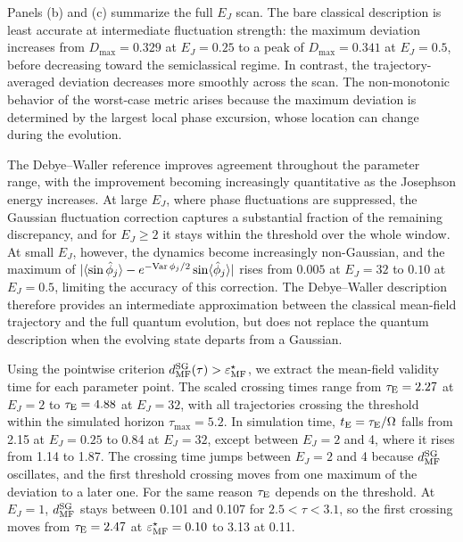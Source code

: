 \documentclass[pra,twocolumn,superscriptaddress,nofootinbib,floatfix]{revtex4-2}
\theoremstyle{remark}
\begin{document}
Panels (b) and (c) summarize the full \(E_J\) scan. The bare classical description is least accurate at intermediate fluctuation strength: the maximum deviation increases from \(D_{\max}=0.329\) at \(E_J=0.25\) to a peak of \(D_{\max}=0.341\) at \(E_J=0.5\), before decreasing toward the semiclassical regime. In contrast, the trajectory-averaged deviation decreases more smoothly across the scan. The non-monotonic behavior of the worst-case metric arises because the maximum deviation is determined by the largest local phase excursion, whose location can change during the evolution.

The Debye--Waller reference improves agreement throughout the parameter range, with the improvement becoming increasingly quantitative as the Josephson energy increases. At large \(E_J\), where phase fluctuations are suppressed, the Gaussian fluctuation correction captures a substantial fraction of the remaining discrepancy, and for \(E_J\ge2\) it stays within the threshold over the whole window. At small \(E_J\), however, the dynamics become increasingly non-Gaussian, and the maximum of \(|\langle\sin\hat\phi_j\rangle-e^{-{\rm Var}\,\phi_j/2}\sin\langle\hat\phi_j\rangle|\) rises from \(0.005\) at \(E_J=32\) to \(0.10\) at \(E_J=0.5\), limiting the accuracy of this correction. The Debye--Waller description therefore provides an intermediate approximation between the classical mean-field trajectory and the full quantum evolution, but does not replace the quantum description when the evolving state departs from a Gaussian.

Using the pointwise criterion \(d_{\rm MF}^{\rm SG}(\tau)>\varepsilon_{\rm MF}^{\star}\), we extract the mean-field validity time for each parameter point. The scaled crossing times range from \(\tau_{\rm E}=2.27\) at \(E_J=2\) to \(\tau_{\rm E}=4.88\) at \(E_J=32\), with all trajectories crossing the threshold within the simulated horizon \(\tau_{\max}=5.2\). In simulation time, \(t_{\rm E}=\tau_{\rm E}/\Omega\) falls from 2.15 at \(E_J=0.25\) to 0.84 at \(E_J=32\), except between \(E_J=2\) and 4, where it rises from 1.14 to 1.87. The crossing time jumps between \(E_J=2\) and 4 because \(d_{\rm MF}^{\rm SG}\) oscillates, and the first threshold crossing moves from one maximum of the deviation to a later one. For the same reason \(\tau_{\rm E}\) depends on the threshold. At \(E_J=1\), \(d_{\rm MF}^{\rm SG}\) stays between 0.101 and 0.107 for \(2.5<\tau<3.1\), so the first crossing moves from \(\tau_{\rm E}=2.47\) at \(\varepsilon^\star_{\rm MF}=0.10\) to 3.13 at 0.11.
\end{document}
